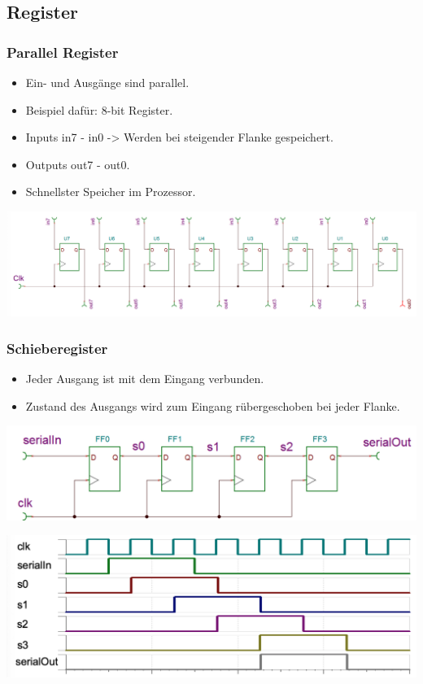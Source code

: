 \subsection{Register}
\subsubsection{Parallel Register}
\begin{itemize}
	\item Ein- und Ausgänge sind parallel.
	\item Beispiel dafür: 8-bit Register.
	\item Inputs \quad in7 - in0 -> Werden bei steigender Flanke gespeichert.
	\item Outputs \quad out7 - out0.
	\item Schnellster Speicher im Prozessor.
\end{itemize}
\begin{center}
	\includegraphics[width=1\linewidth]{images/8bitreg.png}
\end{center}
\subsubsection{Schieberegister}
\begin{itemize}
	\item Jeder Ausgang ist mit dem Eingang verbunden.
	\item Zustand des Ausgangs wird zum Eingang rübergeschoben bei jeder Flanke.
\end{itemize}
\begin{center}
	\includegraphics[width=1\linewidth]{images/schiebereg.png}
\end{center}
\begin{center}
	\includegraphics[width=1\linewidth]{images/schieberegtime.png}
\end{center}

